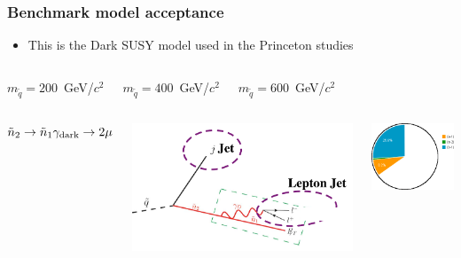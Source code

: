 \documentclass[compress]{beamer}
\newcommand{\s}[1]{{\mbox{\scriptsize #1}}}
\begin{document}
\begin{frame}
\frametitle{Benchmark model acceptance}

\begin{itemize}
\item This is the Dark SUSY model used in the Princeton studies
\end{itemize}

\begin{columns}

\centering $m_{\tilde{q}} = 200$~GeV/$c^2$

\centering $m_{\tilde{q}} = 400$~GeV/$c^2$

\centering $m_{\tilde{q}} = 600$~GeV/$c^2$
\end{columns}

\vspace{0.25 cm}
\begin{columns}
\mbox{$\tilde{n}_2 \to \tilde{n}_1 \gamma_\s{dark} \to 2\mu$}

\includegraphics[width=\linewidth]{diagram_squark_2mu.png}

\includegraphics[width=\linewidth]{chart2d_2mu_200.png}


\end{columns}
\end{frame}
\end{document}

